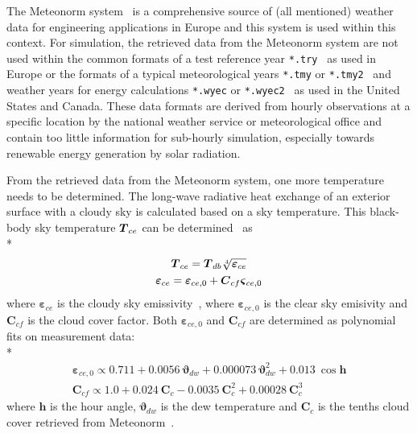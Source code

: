 The Meteonorm system~\cite{Meteotest2008} is a comprehensive source of (all mentioned) weather data for engineering applications in Europe and this system is used within this context. For simulation, the retrieved data from the Meteonorm system are not used within the common formats of a test reference year \texttt{*.try}~\cite{NCDC1981,EC1985} as used in Europe or the formats of a typical meteorological years \texttt{*.tmy} or \texttt{*.tmy2}~\cite{NCDC1976b,NREC1995} and weather years for energy calculations \texttt{*.wyec} or \texttt{*.wyec2}~\cite{ASHRAE1985} as used in the United States and Canada. These data formats are derived from hourly observations at a specific location by the national weather service or meteorological office and contain too little information for sub-hourly simulation, especially towards renewable energy generation by solar radiation.

From the retrieved data from the Meteonorm system, one more temperature needs to be determined. The long-wave radiative heat exchange of an exterior surface with a cloudy sky is calculated based on a sky temperature. This black-body sky temperature $\boldsymbol{T}_{ce}$ can be determined~\cite{Walton1983,Martin1984} as \\*
\begin{gather}
\boldsymbol{T}_{ce}=\boldsymbol{T}_{db} \sqrt[4]{\boldsymbol{\varepsilon}_{ce}} \\
\boldsymbol{\varepsilon}_{ce} = \boldsymbol{\varepsilon}_{ce,0}+\boldsymbol{C}_{cf} \boldsymbol{\varsigma}_{ce,0}
\end{gather}
where $\boldsymbol{\varepsilon}_{ce}$ is the cloudy sky emissivity~\cite{Berdahl1982,Berdahl1984,Martin1984}, where $\boldsymbol{\varepsilon}_{ce,0}$ is the clear sky emisivity and $\boldsymbol{C}_{cf}$ is the cloud cover factor. Both  $\boldsymbol{\varepsilon}_{ce,0}$ and $\boldsymbol{C}_{cf}$ are determined as polynomial fits on measurement data: \\*
\begin{gather}
\boldsymbol{\varepsilon}_{ce,0} \varpropto 0.711 + 0.0056\ \boldsymbol{\vartheta}_{dw} + 0.000073\ \boldsymbol{\vartheta}_{dw}^{2} + 0.013\ \cos \boldsymbol{h} \\
\boldsymbol{C}_{cf} \varpropto 1.0 + 0.024\ \boldsymbol{C}_{c} - 0.0035\ \boldsymbol{C}_{c}^{2} + 0.00028\ \boldsymbol{C}_{c}^{3}
\end{gather}
where $\boldsymbol{h}$ is the hour angle, $\boldsymbol{\vartheta}_{dw}$ is the dew temperature and $\boldsymbol{C}_{c}$ is the tenths cloud cover retrieved from Meteonorm~\cite{Kasten1979,Perraudeau1990}. 

